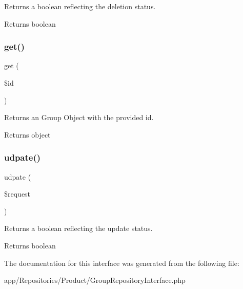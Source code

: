 Returns a boolean reflecting the deletion status.

\begin{DoxyReturn}{Returns}
boolean 
\end{DoxyReturn}
\mbox{\label{interface_app_1_1_repositories_1_1_product_1_1_group_repository_interface_a50e3bfb586b2f42932a6a93f3fbb0828}} 
\subsubsection{\texorpdfstring{get()}{get()}}
{\footnotesize\ttfamily get (\begin{DoxyParamCaption}\item[{}]{\$id }\end{DoxyParamCaption})}

Returns an Group Object with the provided id.

\begin{DoxyReturn}{Returns}
object 
\end{DoxyReturn}
\mbox{\label{interface_app_1_1_repositories_1_1_product_1_1_group_repository_interface_a2aedea52c52e54ba3c4c9f60423e7ef1}} 
\subsubsection{\texorpdfstring{udpate()}{udpate()}}
{\footnotesize\ttfamily udpate (\begin{DoxyParamCaption}\item[{}]{\$request }\end{DoxyParamCaption})}

Returns a boolean reflecting the update status.

\begin{DoxyReturn}{Returns}
boolean 
\end{DoxyReturn}


The documentation for this interface was generated from the following file\+:\begin{DoxyCompactItemize}
\item 
app/\+Repositories/\+Product/Group\+Repository\+Interface.\+php\end{DoxyCompactItemize}
